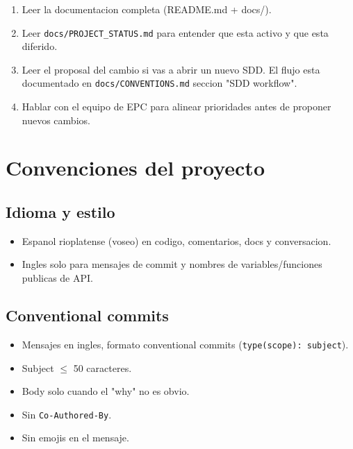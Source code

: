 \documentclass[11pt,a4paper,oneside]{report}
\begin{document}
\begin{enumerate}[leftmargin=*]
    \item Leer la documentacion completa (README.md + docs/).
    \item Leer \texttt{docs/PROJECT\_STATUS.md} para entender que esta activo y que esta diferido.
    \item Leer el proposal del cambio si vas a abrir un nuevo SDD. El flujo esta documentado en \texttt{docs/CONVENTIONS.md} seccion "SDD workflow".
    \item Hablar con el equipo de EPC para alinear prioridades antes de proponer nuevos cambios.
\end{enumerate}


\chapter{Convenciones del proyecto}

\section{Idioma y estilo}

\begin{itemize}[leftmargin=*]
    \item Espanol rioplatense (voseo) en codigo, comentarios, docs y conversacion.
    \item Ingles solo para mensajes de commit y nombres de variables/funciones publicas de API.
\end{itemize}

\section{Conventional commits}

\begin{itemize}[leftmargin=*]
    \item Mensajes en ingles, formato conventional commits (\texttt{type(scope): subject}).
    \item Subject $\leq$ 50 caracteres.
    \item Body solo cuando el "why" no es obvio.
    \item Sin \texttt{Co-Authored-By}.
    \item Sin emojis en el mensaje.
\end{itemize}
\end{document}
